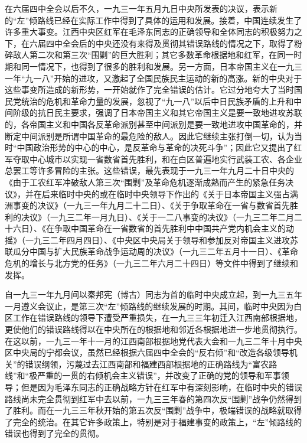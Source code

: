 在六届四中全会以后不久，一九三一年五月九日中央所发表的决议，表示新的“左”倾路线已经在实际工作中得到了具体的运用和发展。接着，中国连续发生了许多重大事变。江西中央区红军在毛泽东同志的正确领导和全体同志的积极努力之下，在六届四中全会后的中央还没有来得及贯彻其错误路线的情况之下，取得了粉碎敌人第二次和第三次“围剿”的巨大胜利；其它多数革命根据地和红军，在同一时期和同一情况下，也得到了很多的胜利和发展。另一方面，日本帝国主义在一九三一年“九一八”开始的进攻，又激起了全国民族民主运动的新的高涨。新的中央对于这些事变所造成的新形势，一开始就作了完全错误的估计。它过分地夸大了当时国民党统治的危机和革命力量的发展，忽视了“九一八”以后中日民族矛盾的上升和中间阶级的抗日民主要求，强调了日本帝国主义和其它帝国主义是要一致地进攻苏联的，各帝国主义和中国各反革命派别甚至中间派别是要一致地进攻中国革命的，并断定中间派别是所谓中国革命的最危险的敌人。因此它继续主张打倒一切，认为当时“中国政治形势的中心的中心，是反革命与革命的决死斗争”；因此它又提出了红军夺取中心城市以实现一省数省首先胜利，和在白区普遍地实行武装工农、各企业总罢工等许多冒险的主张。这些错误，最先表现于一九三一年九月二十日中央的《由于工农红军冲破敌人第三次“围剿”及革命危机逐渐成熟而产生的紧急任务决议》，并在后来临时中央的或在临时中央领导下作出的《关于日本帝国主义强占满洲事变的决议》（一九三一年九月二十二日）、《关于争取革命在一省与数省首先胜利的决议》（一九三二年一月九日）、《关于一二八事变的决议》（一九三二年二月二十六日）、《在争取中国革命在一省数省的首先胜利中中国共产党内机会主义的动摇》（一九三二年四月四日）、《中央区中央局关于领导和参加反对帝国主义进攻苏联瓜分中国与扩大民族革命战争运动周的决议》（一九三二年五月十一日）、《革命危机的增长与北方党的任务》（一九三二年六月二十四日）等文件中得到了继续和发挥。

自一九三一年九月间以秦邦宪（博古）同志为首的临时中央成立起，到一九三五年一月遵义会议止，是第三次“左”倾路线的继续发展的时期。其间，临时中央因为白区工作在错误路线的领导下遭受严重损失，在一九三三年初迁入江西南部根据地，更使他们的错误路线得以在中央所在的根据地和邻近各根据地进一步地贯彻执行。在这以前，一九三一年十一月的江西南部根据地党代表大会和一九三二年十月中央区中央局的宁都会议，虽然已经根据六届四中全会的“反右倾”和“改造各级领导机关”的错误纲领，污蔑过去江西南部和福建西部根据地的正确路线为“富农路线”和“极严重的一贯的右倾机会主义错误”，并改变了正确的党的领导和军事领导；但是因为毛泽东同志的正确战略方针在红军中有深刻影响，在临时中央的错误路线尚未完全贯彻到红军中去以前，一九三三年春的第四次反“围剿”战争仍然得到了胜利。而在一九三三年秋开始的第五次反“围剿”战争中，极端错误的战略就取得了完全的统治。在其它许多政策上，特别是对于福建事变的政策上，“左”倾路线的错误也得到了完全的贯彻。

